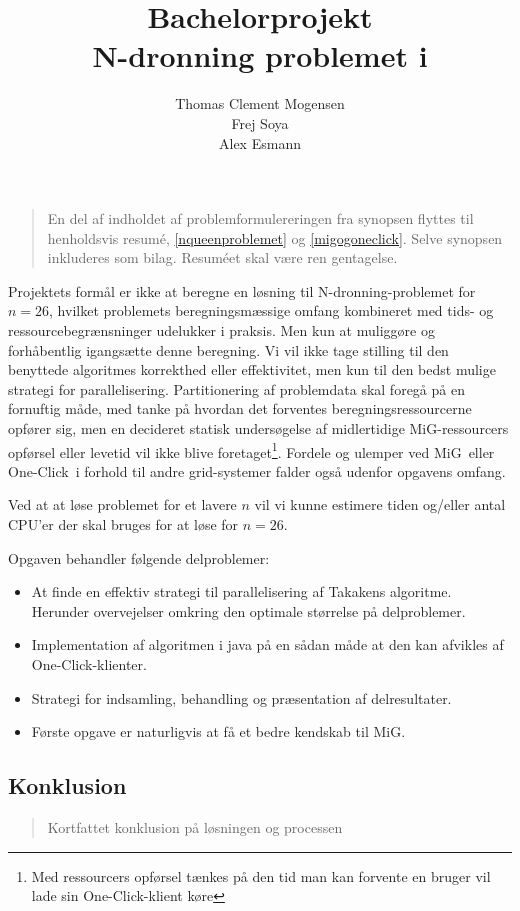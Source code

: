 \documentclass[pdf,draft,a4paper,10pt]{article}
\title{Bachelorprojekt\\N-dronning problemet i \mig}
\author{Thomas Clement Mogensen \\ Frej Soya \\ Alex Esmann }
\newcommand{\mig}{MiG}
\newcommand{\oc}{One-Click}
\begin{document}
\maketitle
\tableofcontents

\newpage
\setcounter{page}{1}
\abstract
\begin{verse}
	En del af indholdet af problemformulereringen fra synopsen flyttes til henholdsvis resumé, \ref{nqueenproblemet} og \ref{migogoneclick}. Selve synopsen inkluderes som bilag. Resuméet skal være ren gentagelse.
\end{verse}
Projektets formål er ikke at beregne en løsning til N-dronning-problemet for $n=26$, hvilket problemets beregningsmæssige omfang kombineret med tids- og ressourcebegrænsninger udelukker i praksis. Men kun at muliggøre og forhåbentlig igangsætte denne beregning.
Vi vil ikke tage stilling til den benyttede algoritmes korrekthed eller effektivitet, men kun til den bedst mulige strategi for parallelisering. Partitionering af problemdata skal foregå på en fornuftig måde, med tanke på hvordan det forventes beregningsressourcerne opfører sig, men en decideret statisk undersøgelse af midlertidige \mig-ressourcers opførsel eller levetid vil ikke blive foretaget\footnote{Med ressourcers opførsel tænkes på den tid man kan forvente en bruger vil lade sin \oc-klient køre}. Fordele og ulemper ved \mig\ eller \oc\ i forhold til andre grid-systemer falder også udenfor opgavens omfang.

Ved at at løse problemet for et lavere $n$ vil vi kunne estimere tiden og/eller antal CPU'er der skal bruges for at løse for $n=26$.

 Opgaven behandler følgende delproblemer:
\begin{itemize}
\item At finde en effektiv strategi til parallelisering af Takakens algoritme. Herunder overvejelser omkring den optimale størrelse på delproblemer.
\item Implementation af algoritmen i java på en sådan måde at den kan afvikles af \oc-klienter.
\item Strategi for indsamling, behandling og præsentation af delresultater.
\item Første opgave er naturligvis at få et bedre kendskab til \mig.
\end{itemize}


\subsection*{Konklusion}\label{konklusion}
\begin{verse}
	Kortfattet konklusion på løsningen og processen
\end{verse}
\end{document}

